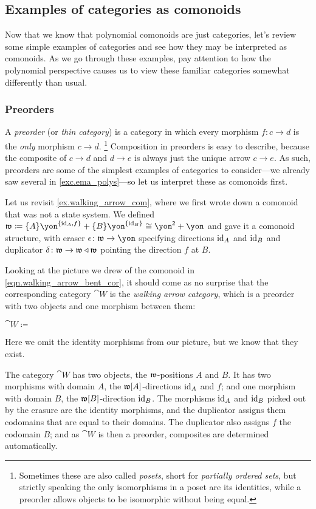 \documentclass[Book-Poly]{subfiles}
\begin{document}
\subsection{Examples of categories as comonoids}
Now that we know that polynomial comonoids are just categories, let's review some simple examples of categories and see how they may be interpreted as comonoids.
As we go through these examples, pay attention to how the polynomial perspective causes us to view these familiar categories somewhat differently than usual. %

\subsubsection{Preorders}

A \emph{preorder} (or \emph{thin category}) is a category in which every morphism $f\colon c\to d$ is the \emph{only} morphism $c\to d$.%
\footnote{Sometimes these are also called \emph{posets}, short for \emph{partially ordered sets}, but strictly speaking the only isomorphisms in a poset are its identities, while a preorder allows objects to be isomorphic without being equal.}
Composition in preorders is easy to describe, because the composite of $c\to d$ and $d\to e$ is always just the unique arrow $c\to e$.
As such, preorders are some of the simplest examples of categories to consider---we already saw several in \cref{exc.ema_polys}---so let us interpret these as comonoids first.

\begin{example}\label{ex.walking_arrow_cat}
Let us revisit \cref{ex.walking_arrow_com}, where we first wrote down a comonoid that was not a state system.
We defined $\ema{w}\coloneqq\{A\}\yon^{\{\id_A,f\}}+\{B\}\yon^{\{\id_B\}}\iso\yon^\2+\yon$ and gave it a comonoid structure, with eraser $\epsilon\colon\ema{w}\to\yon$ specifying directions $\mathrm{id}_A$ and $\mathrm{id}_B$ and duplicator $\delta\colon\mathfrak{w}\to\mathfrak{w}\mathbin{\triangleleft}\mathfrak{w}$ pointing the direction $f$ at $B$.

Looking at the picture we drew of the comonoid in \eqref{eqn.walking_arrow_bent_cor}, it should come as no surprise that the corresponding category $\cat{W}$ is the \emph{walking arrow category}, which is a preorder with two objects and one morphism between them:
\begin{center}
    $\cat{W}\coloneqq\:$
\end{center}
Here we omit the identity morphisms from our picture, but we know that they exist.

The category $\cat{W}$ has two objects, the $\mathfrak{w}$-positions $A$ and $B$.
It has two morphisms with domain $A$, the $\mathfrak{w}[A]$-directions $\mathrm{id}_A$ and $f$; and one morphism with domain $B$, the $\mathfrak{w}[B]$-direction $\mathrm{id}_B$.
The morphisms $\mathrm{id}_A$ and $\mathrm{id}_B$ picked out by the erasure are the identity morphisms, and the duplicator assigns them codomains that are equal to their domains.
The duplicator also assigns $f$ the codomain $B$; and as $\cat{W}$ is then a preorder, composites are determined automatically.
\end{example}
\end{document}
